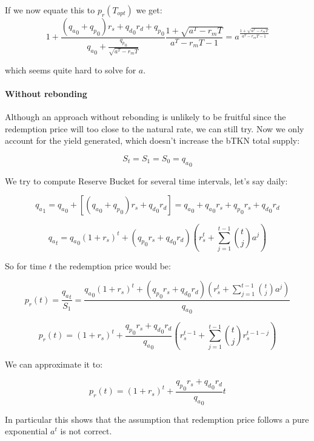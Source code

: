 \documentclass{article}
\begin{document}
If we now equate this to $p_r(T_{opt})$ we get:
\begin{equation}
  \label{}
1 + \frac{({q_a}_0 + {q_p}_0)r_s + {q_d}_0 r_d + {q_p}_0}{{q_a}_0 + \frac{{q_p}_0}{\sqrt{a^T - r_mT}}} \frac{1+ \sqrt{a^T - r_mT}}{a^T - r_mT - 1} = a ^{\frac{1+ \sqrt{a^T - r_mT}}{a^T - r_mT - 1}}
\end{equation}

which seems quite hard to solve for $a$.

\paragraph{Without rebonding}

Although an approach without rebonding is unlikely to be fruitful since the redemption price will too close to the natural rate, we can still try. Now we only account for the yield generated, which doesn’t increase the bTKN total supply:

\[
S_t = S_1 = S_0 = {q_a}_0
\]

We try to compute Reserve Bucket for several time intervals, let’s say daily:

\[
{q_a}_1 = {q_a}_0 + [({q_a}_0 + {q_p}_0) r_s + {q_d}_0 r_d] = {q_a}_0 + {q_a}_0 r_s + {q_p}_0 r_s + {q_d}_0 r_d
\]

\[
{q_a}_t = {q_a}_0(1+r_s)^t + ({q_p}_0 r_s + {q_d}_0 r_d) \left(r_s^t + \sum_{j=1}^{t-1} \binom{t}{j} a^j \right)
\]

So for time $t$ the redemption price would be:

\[
p_r(t) = \frac{{q_a}_t}{S_1} = \frac{{q_a}_0(1+r_s)^t + ({q_p}_0 r_s + {q_d}_0 r_d) \left(r_s^t + \sum_{j=1}^{t-1} \binom{t}{j} a^j \right)}{{q_a}_0}
\]

\begin{equation}
  \label{eq:conservative_p_r_base_2_a}
p_r(t) = (1+r_s)^t + \frac{{q_p}_0 r_s + {q_d}_0 r_d}{{q_a}_0} \left(r_s^{t-1} + \sum_{j=1}^{t-1} \binom{t}{j} r_s^{t-1-j} \right)
\end{equation}

We can approximate it to:

\begin{equation}
  \label{eq:conservative_p_r_base_2_b}
p_r(t) = (1+r_s)^t + \frac{{q_p}_0 r_s + {q_d}_0 r_d}{{q_a}_0} t
\end{equation}

In particular this shows that the assumption that redemption price follows a pure exponential $a^t$ is not correct.
\end{document}

